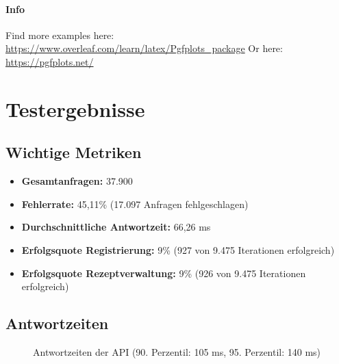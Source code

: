 \paragraph*{Info}
Find more examples here: \url{https://www.overleaf.com/learn/latex/Pgfplots_package}
Or here: \url{https://pgfplots.net/}


\section*{Testergebnisse}

\subsection*{Wichtige Metriken}
\begin{itemize}
    \item \textbf{Gesamtanfragen:} 37.900
    \item \textbf{Fehlerrate:} 45,11\% (17.097 Anfragen fehlgeschlagen)
    \item \textbf{Durchschnittliche Antwortzeit:} 66,26 ms
    \item \textbf{Erfolgsquote Registrierung:} 9\% (927 von 9.475 Iterationen erfolgreich)
    \item \textbf{Erfolgsquote Rezeptverwaltung:} 9\% (926 von 9.475 Iterationen erfolgreich)
\end{itemize}

\subsection*{Antwortzeiten}
\begin{figure}
    \centering
    \caption{Antwortzeiten der API (90. Perzentil: 105 ms, 95. Perzentil: 140 ms)}
    \label{fig:response_time}
\end{figure}

